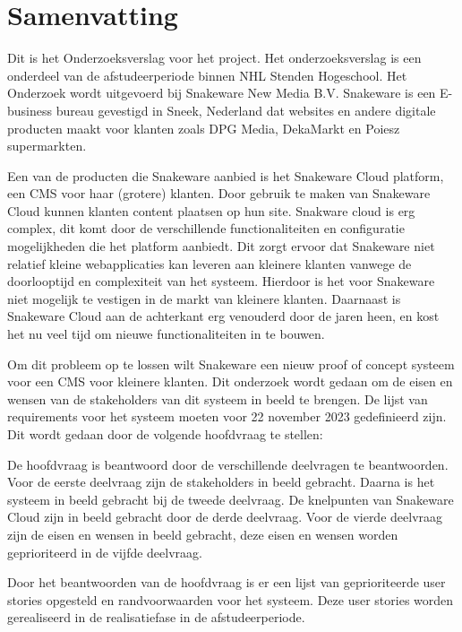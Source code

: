 \chapter*{Samenvatting}
Dit is het Onderzoeksverslag voor het  project.
Het onderzoeksverslag is een onderdeel van de afstudeerperiode binnen NHL Stenden Hogeschool.
Het Onderzoek wordt uitgevoerd bij Snakeware New Media B.V. 
Snakeware is een E-business bureau gevestigd in Sneek, Nederland dat websites en andere digitale producten maakt voor klanten zoals DPG Media, DekaMarkt en Poiesz supermarkten.

\whitespace
Een van de producten die Snakeware aanbied is het Snakeware Cloud platform, een \gls{CMS} voor haar (grotere) klanten.
Door gebruik te maken van Snakeware Cloud kunnen klanten content plaatsen op hun site.
Snakware cloud is erg complex, dit komt door de verschillende functionaliteiten en configuratie mogelijkheden die het platform aanbiedt.
Dit zorgt ervoor dat Snakeware niet relatief kleine webapplicaties kan leveren aan kleinere klanten vanwege de doorlooptijd en complexiteit van het systeem.
Hierdoor is het voor Snakeware niet mogelijk te vestigen in de markt van kleinere klanten.
Daarnaast is Snakeware Cloud aan de achterkant erg venouderd door de jaren heen, en kost het nu veel tijd om nieuwe functionaliteiten in te bouwen.

\whitespace
Om dit probleem op te lossen wilt Snakeware een nieuw proof of concept systeem voor een \gls{CMS} voor kleinere klanten.
Dit onderzoek wordt gedaan om de eisen en wensen van de stakeholders van dit systeem in beeld te brengen.
De lijst van requirements voor het systeem moeten voor 22 november 2023 gedefinieerd zijn.
Dit wordt gedaan door de volgende hoofdvraag te stellen:

\begin{center}
    \textit{\MainQuestion}
\end{center}

\whitespace
De hoofdvraag is beantwoord door de verschillende deelvragen te beantwoorden.
Voor de eerste deelvraag zijn de stakeholders in beeld gebracht.
Daarna is het systeem in beeld gebracht bij de tweede deelvraag.
De knelpunten van Snakeware Cloud zijn in beeld gebracht door de derde deelvraag.
Voor de vierde deelvraag zijn de eisen en wensen in beeld gebracht, deze eisen en wensen worden geprioriteerd in de vijfde deelvraag.

\whitespace
Door het beantwoorden van de hoofdvraag is er een lijst van geprioriteerde user stories opgesteld en randvoorwaarden voor het systeem.
Deze user stories worden gerealiseerd in de realisatiefase in de afstudeerperiode.
